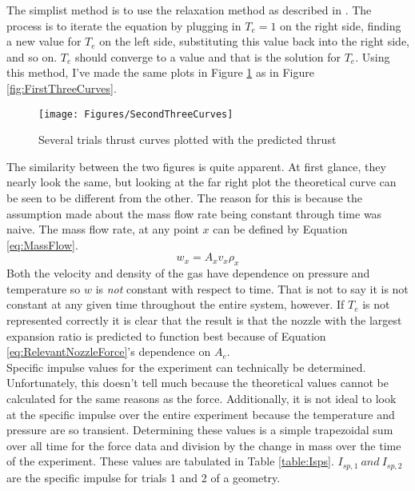 The simplist method is to use the relaxation method as described in \cite{newman}. The process is to iterate the equation by plugging in $T_e=1$ on the right side, finding a new value for $T_e$ on the left side, substituting this value back into the right side, and so on. $T_e$ should converge to a value and that is the solution for $T_e$. Using this method, I've made the same plots in Figure \ref{fig:SecondThreeCurves} as in Figure \ref{fig:FirstThreeCurves}.
\begin{figure}[h!]
\centering
\texttt{[image: Figures/SecondThreeCurves]}
\caption{Several trials thrust curves plotted with the predicted thrust}
\label{fig:SecondThreeCurves}
\end{figure}
The similarity between the two figures is quite apparent. At first glance, they nearly look the same, but looking at the far right plot the theoretical curve can be seen to be different from the other. The reason for this is because the assumption made about the mass flow rate being constant through time was naive. The mass flow rate, at any point $x$  can be defined by Equation \ref{eq:MassFlow}.
\begin{equation}
w_x=A_x v_x \rho_x
\end{equation}
Both the velocity and density of the gas have dependence on pressure and temperature so $w$ is \textit{not} constant with respect to time. That is not to say it is not constant at any given time throughout the entire system, however. If $T_e$ is not represented correctly it is clear that the result is that the nozzle with the largest expansion ratio is predicted to function best because of Equation \ref{eq:RelevantNozzleForce}'s dependence on $A_e$. \\
Specific impulse values for the experiment can technically be determined. Unfortunately, this doesn't tell much because the theoretical values cannot be calculated for the same reasons as the force. Additionally, it is not ideal to look at the specific impulse over the entire experiment because the temperature and pressure are so transient. Determining these values is a simple trapezoidal sum over all time for the force data and division by the change in mass over the time of the experiment. These values are tabulated in Table \ref{table:Isps}. $I_{sp,1}\ and\ I_{sp,2}$ are the specific impulse for trials 1 and 2 of a geometry. 
